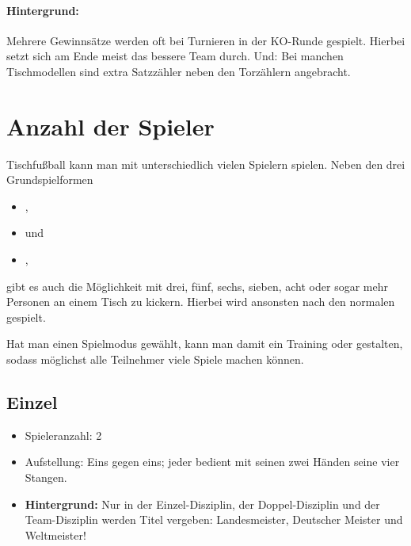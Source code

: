 \paragraph{Hintergrund:}
Mehrere Gewinnsätze werden oft bei Turnieren in der KO-Runde gespielt. Hierbei setzt sich am Ende meist das bessere Team durch. 
Und: Bei manchen Tischmodellen sind extra Satzzähler neben den Torzählern angebracht. 




\section{Anzahl der Spieler}
\label{spielformen:npersonen}

Tischfußball kann man mit unterschiedlich vielen Spielern spielen. 
Neben den drei Grundspielformen 
\begin{itemize}
\item {},
\item {} und 
\item {}, 
\end{itemize}
gibt es auch die Möglichkeit mit drei, fünf, sechs, sieben, acht oder sogar mehr Personen an einem Tisch zu kickern.
Hierbei wird ansonsten nach den normalen  gespielt.

Hat man einen Spielmodus gewählt, kann man damit ein Training oder  gestalten, sodass möglichst alle Teilnehmer viele Spiele machen können. 


\subsection{Einzel}
\label{spielformen:npersonen:einzel}

\begin{itemize}
\item Spieleranzahl: 2
\item Aufstellung: Eins gegen eins; jeder bedient mit seinen zwei Händen seine vier Stangen.
\item {\bf Hintergrund:} Nur in der Einzel-Disziplin, der Doppel-Disziplin und der Team-Disziplin werden Titel vergeben: Landesmeister, Deutscher Meister und Weltmeister!  
\end{itemize}
 
